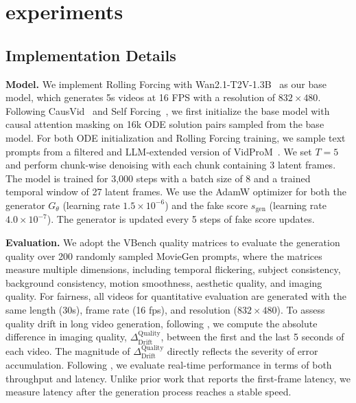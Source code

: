 \section{experiments}




\subsection{Implementation Details}

\textbf{Model.}
We implement Rolling Forcing with Wan2.1-T2V-1.3B~\citep{wan2025wan} as our base model, which generates 5s videos at 16 FPS with a resolution of $832\times480$.
Following CausVid~\citep{yin2025slow} and Self Forcing~\citep{huang2025self}, we first initialize the base model with causal attention masking on 16k ODE solution pairs sampled from the base model.
For both ODE initialization and Rolling Forcing training, we sample text prompts from a filtered and LLM-extended version of VidProM~\citep{wang2024vidprom}. 
We set $T=5$ and perform chunk-wise denoising with each chunk containing 3 latent frames. 
The model is trained for 3,000 steps with a batch size of 8 and a trained temporal window of 27 latent frames.  
We use the AdamW optimizer for both the generator $G_\theta$ (learning rate $1.5\times10^{-6}$) and the fake score $s_{\text{gen}}$ (learning rate $4.0\times10^{-7}$). The generator is updated every 5 steps of fake score updates.


\textbf{Evaluation.} We adopt the VBench \citep{huang2024vbench} quality matrices to evaluate the generation quality over 200 randomly sampled MovieGen \citep{polyak2024movie} prompts, where the matrices measure multiple dimensions, including temporal flickering, subject consistency, background consistency, motion smoothness, aesthetic quality, and imaging quality. For fairness, all videos for quantitative evaluation are generated with the same length (30s), frame rate (16 fps), and resolution ($832 \times 480$). 
To assess quality drift in long video generation, following \citet{zhang2025packing, yin2025slow}, we compute the absolute difference in imaging quality, $\Delta^{\text{Quality}}_{\text{Drift}}$, between the first and the last 5 seconds of each video. The magnitude of $\Delta^{\text{Quality}}_{\text{Drift}}$ directly reflects the severity of error accumulation. Following \citet{huang2025self}, we evaluate real-time performance in terms of both throughput and latency. Unlike prior work that reports the first-frame latency, we measure latency after the generation process reaches a stable speed.


